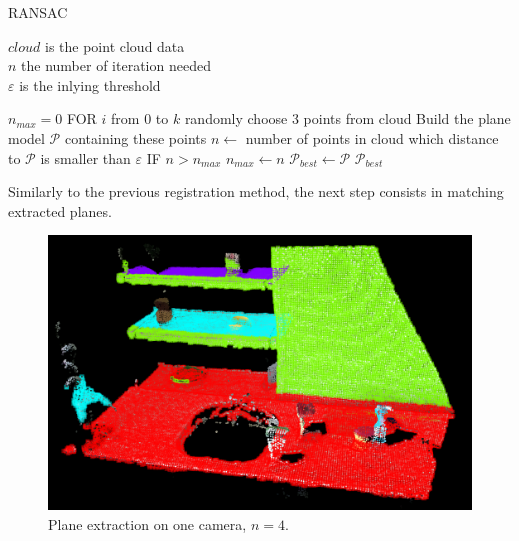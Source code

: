 \begin{algorithm}
        \caption{RANSAC}\label{alg:ransac}
        \REQUIRE $cloud$ is the point cloud data\\
        \REQUIRE $n$ the number of iteration needed\\
        \REQUIRE $\varepsilon$ is the inlying threshold
        \begin{algorithmic}[1]
            \State $n_{max} = 0$
                \State FOR $i$ from $0$ to $k$
                \State \qquad randomly choose 3 points from cloud 
                \State \qquad Build the plane model $\mathcal{P}$ containing these points
                \State \qquad $n \longleftarrow$ number of points in cloud which distance to $\mathcal{P}$ is smaller than $\varepsilon$
                \State \qquad IF $n > n_{max}$
                \State \qquad\qquad $n_{max} \longleftarrow n$
                \State \qquad\qquad $\mathcal{P}_{best} \longleftarrow \mathcal{P}$
                \State \Return $\mathcal{P}_{best}$
            \EndFunction
        \end{algorithmic}
    \end{algorithm}

Similarly to the previous registration method, the next step consists in matching extracted planes. \\

\begin{figure}[h!]
    \centering
    \includegraphics[width=\textwidth]{images/planes.png}
    \caption{Plane extraction on one camera, $n=4$.}
    \label{fig:planes}
\end{figure}
    
